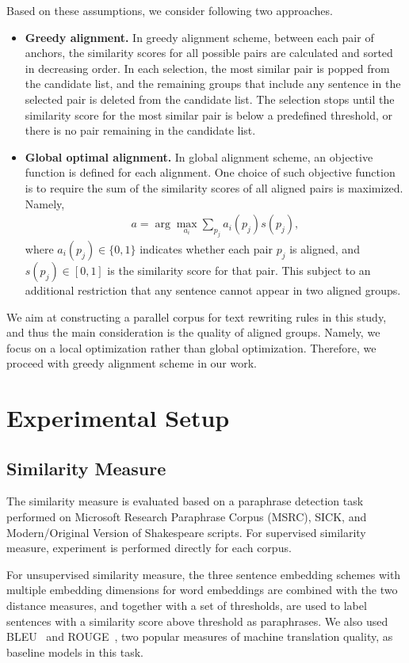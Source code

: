 \documentclass[runningheads]{llncs}
\begin{document}
Based on these assumptions, we consider following two approaches.
\begin{itemize}
	\item \textbf{Greedy alignment.} In greedy alignment scheme, between each pair of anchors, the similarity scores for all possible pairs are calculated and sorted in decreasing order. In each selection, the most similar pair is popped from the candidate list, and the remaining groups that include any sentence in the selected pair is deleted from the candidate list. The selection stops until the similarity score for the most similar pair is below a predefined threshold, or there is no pair remaining in the candidate list.
	\item \textbf{Global optimal alignment.} In global alignment scheme, an objective function is defined for each alignment. One choice of such objective function is to require the sum of the similarity scores of all aligned pairs is maximized. Namely,
	\begin{align*}
	a = \arg\max_{a_i} \sum_{p_j} a_i(p_j)s(p_j),
	\end{align*}
	where $a_i(p_j)\in \{0, 1\}$ indicates whether each pair $p_j$ is aligned, and $s(p_j)\in [0, 1]$ is the similarity score for that pair. This subject to an additional restriction that any sentence cannot appear in two aligned groups.
\end{itemize}
We aim at constructing a parallel corpus for text rewriting rules in this study, and thus the main consideration is the quality of aligned groups. Namely, we focus on a local optimization rather than global optimization. Therefore, we proceed with greedy alignment scheme in our work.


\section{Experimental Setup}

\subsection{Similarity Measure}

The similarity measure is evaluated based on a paraphrase detection task performed on Microsoft Research Paraphrase Corpus (MSRC), SICK, and Modern/Original Version of Shakespeare scripts. For supervised similarity measure, experiment is performed directly for each corpus. 

For unsupervised similarity measure, the three sentence embedding schemes with multiple embedding dimensions for word embeddings are combined with the two distance measures, and together with a set of thresholds, are used to label sentences with a similarity score above threshold as paraphrases. We also used BLEU~\cite{papineni2002bleu} and ROUGE~\cite{lin2004rouge}, two popular measures of machine translation quality, as baseline models in this task.
\end{document}
